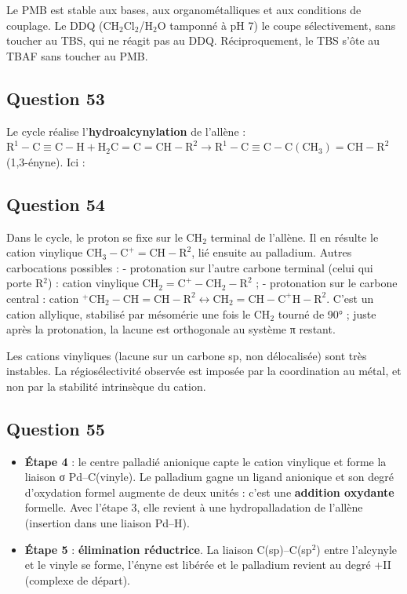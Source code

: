 \documentclass[11pt,a4paper]{article}
\providecommand{\tightlist}{\setlength{\itemsep}{0pt}\setlength{\parskip}{0pt}}
\newcommand{\equationajustee}[1]{%
  \sbox{\boiteequation}{$\displaystyle #1$}%
  \ifdim\wd\boiteequation>\linewidth
    \[\resizebox{\linewidth}{!}{\usebox{\boiteequation}}\]%
  \else
    \[#1\]%
  \fi}
\begin{document}
Le PMB est stable aux bases, aux organométalliques et aux conditions de couplage. Le DDQ (CH\(_2\)Cl\(_2\)/H\(_2\)O tamponné à pH 7) le coupe sélectivement, sans toucher au TBS, qui ne réagit pas au DDQ. Réciproquement, le TBS s'ôte au TBAF sans toucher au PMB.

\hypertarget{question-53}{%
\subsection{Question 53}\label{question-53}}

Le cycle réalise l'\textbf{hydroalcynylation} de l'allène : \(\mathrm{R^1{-}C{\equiv}C{-}H}+\mathrm{H_2C{=}C{=}CH{-}R^2}\rightarrow\mathrm{R^1{-}C{\equiv}C{-}C(CH_3){=}CH{-}R^2}\) (1,3-ényne). Ici :

\equationajustee{\boxed{\mathbf{15}+\mathrm{HC{\equiv}C{-}CH_2OH}\xrightarrow{\ \mathrm{Pd(OAc)_2,\ (4\text{-}MeOPh)_3P,\ CuCl,\ NEt_3}\ }\mathbf{16}}}

\hypertarget{question-54}{%
\subsection{Question 54}\label{question-54}}

Dans le cycle, le proton se fixe sur le CH\(_2\) terminal de l'allène. Il en résulte le cation vinylique \(\mathrm{CH_3{-}C^+{=}CH{-}R^2}\), lié ensuite au palladium. Autres carbocations possibles :
- protonation sur l'autre carbone terminal (celui qui porte R\(^2\)) : cation vinylique \(\mathrm{CH_2{=}C^+{-}CH_2{-}R^2}\) ;
- protonation sur le carbone central : cation \(\mathrm{^+CH_2{-}CH{=}CH{-}R^2}\leftrightarrow\mathrm{CH_2{=}CH{-}C^+H{-}R^2}\). C'est un cation allylique, stabilisé par mésomérie une fois le CH\(_2\) tourné de 90° ; juste après la protonation, la lacune est orthogonale au système π restant.

Les cations vinyliques (lacune sur un carbone sp, non délocalisée) sont très instables. La régiosélectivité observée est imposée par la coordination au métal, et non par la stabilité intrinsèque du cation.

\hypertarget{question-55}{%
\subsection{Question 55}\label{question-55}}

\begin{itemize}
\tightlist
\item
  \textbf{Étape 4} : le centre palladié anionique capte le cation vinylique et forme la liaison σ Pd--C(vinyle). Le palladium gagne un ligand anionique et son degré d'oxydation formel augmente de deux unités : c'est une \textbf{addition oxydante} formelle. Avec l'étape 3, elle revient à une hydropalladation de l'allène (insertion dans une liaison Pd--H).
\item
  \textbf{Étape 5} : \textbf{élimination réductrice}. La liaison C(sp)--C(sp\(^2\)) entre l'alcynyle et le vinyle se forme, l'ényne est libérée et le palladium revient au degré +II (complexe de départ).
\end{itemize}
\end{document}
